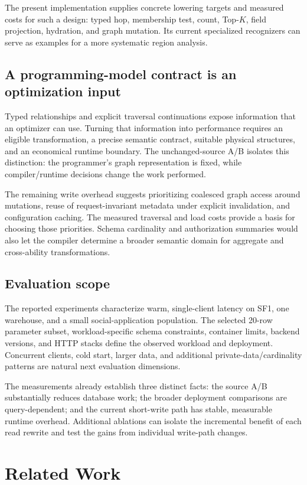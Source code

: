 \documentclass[sigconf,nonacm]{acmart}
\begin{document}
The present implementation supplies concrete lowering targets and measured
costs for such a design: typed hop, membership test, count, Top-$K$, field
projection, hydration, and graph mutation. Its current specialized
recognizers can serve as examples for a more systematic region analysis.

\subsection{A programming-model contract is an optimization input}
Typed relationships and explicit traversal continuations expose information
that an optimizer can use. Turning that information into performance requires
an eligible transformation, a precise semantic contract, suitable physical
structures, and an economical runtime boundary. The unchanged-source A/B
isolates this distinction: the programmer's graph representation is fixed,
while compiler/runtime decisions change the work performed.

The remaining write overhead suggests prioritizing coalesced graph access
around mutations, reuse of request-invariant metadata under explicit
invalidation, and configuration caching. The measured traversal and load
costs provide a basis for choosing those priorities. Schema cardinality and
authorization summaries would also let the compiler determine a broader
semantic domain for aggregate and cross-ability transformations.

\subsection{Evaluation scope}
The reported experiments characterize warm, single-client latency on SF1,
one warehouse, and a small social-application population. The selected
20-row parameter subset, workload-specific schema constraints, container
limits, backend versions, and HTTP stacks define the observed workload and
deployment. Concurrent clients, cold start, larger data, and additional
private-data/cardinality patterns are natural next evaluation dimensions.

The measurements already establish three distinct facts: the source A/B
substantially reduces database work; the broader deployment comparisons are
query-dependent; and the current short-write path has stable, measurable
runtime overhead. Additional ablations can isolate the incremental benefit of
each read rewrite and test the gains from individual write-path changes.

\section{Related Work}
\label{sec:related}
\end{document}
